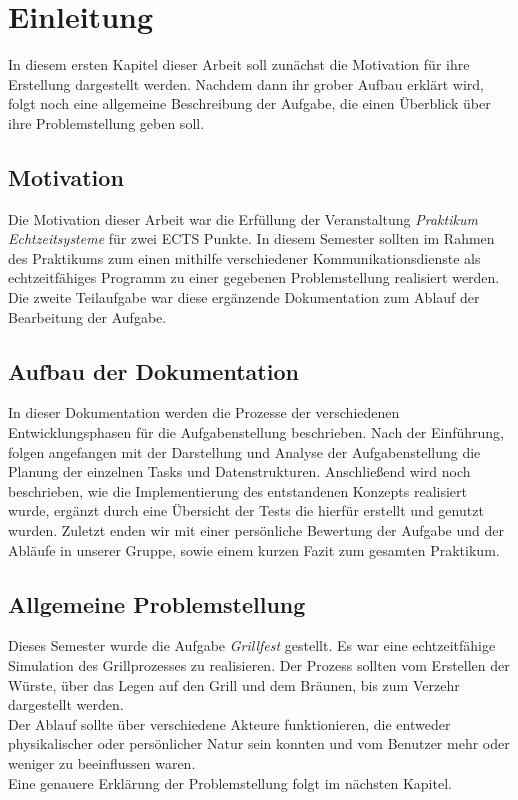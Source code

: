 \chapter{Einleitung}\label{ch:einleitung}

In diesem ersten Kapitel dieser Arbeit soll zunächst die Motivation für ihre Erstellung dargestellt werden. Nachdem dann ihr grober Aufbau erklärt wird, folgt noch eine allgemeine Beschreibung der Aufgabe, die einen Überblick über ihre Problemstellung geben soll.

\section{Motivation}

Die Motivation dieser Arbeit war die Erfüllung der Veranstaltung \textit{Praktikum Echtzeitsysteme} für zwei ECTS Punkte. In diesem Semester sollten im Rahmen des Praktikums zum einen mithilfe verschiedener Kommunikationsdienste als echtzeitfähiges Programm zu einer gegebenen Problemstellung realisiert werden. Die zweite Teilaufgabe war diese ergänzende Dokumentation zum Ablauf der Bearbeitung der Aufgabe.

\section{Aufbau der Dokumentation}

In dieser Dokumentation werden die Prozesse der verschiedenen Entwicklungsphasen für die Aufgabenstellung beschrieben. Nach der Einführung, folgen angefangen mit der Darstellung und Analyse der Aufgabenstellung die Planung der einzelnen Tasks und Datenstrukturen. Anschließend wird noch beschrieben, wie die Implementierung des entstandenen Konzepts realisiert wurde, ergänzt durch eine Übersicht der Tests die hierfür erstellt und genutzt wurden. Zuletzt enden wir mit einer persönliche Bewertung der Aufgabe und der Abläufe in unserer Gruppe, sowie einem kurzen Fazit zum gesamten Praktikum.

\section{Allgemeine Problemstellung}

Dieses Semester wurde die Aufgabe \textit{Grillfest} gestellt. Es war eine echtzeitfähige Simulation des Grillprozesses zu realisieren. Der Prozess sollten vom Erstellen der Würste, über das Legen auf den Grill und dem Bräunen, bis zum Verzehr dargestellt werden.\\
Der Ablauf sollte über verschiedene Akteure funktionieren, die entweder physikalischer oder persönlicher Natur sein konnten und vom Benutzer mehr oder weniger zu beeinflussen waren.\\
Eine genauere Erklärung der Problemstellung folgt im nächsten Kapitel.